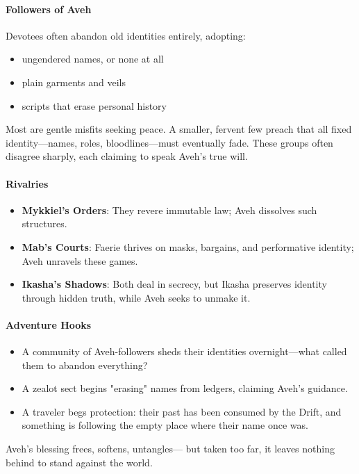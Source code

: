 \documentclass[11pt]{book}
\begin{document}
\paragraph{Followers of Aveh}
Devotees often abandon old identities entirely, adopting:
\begin{itemize}
    \item ungendered names, or none at all  
    \item plain garments and veils  
    \item scripts that erase personal history  
\end{itemize}

Most are gentle misfits seeking peace.  
A smaller, fervent few preach that all fixed identity---names, roles, bloodlines---must eventually fade.  
These groups often disagree sharply, each claiming to speak Aveh's true will.

\paragraph{Rivalries}
\begin{itemize}
    \item \textbf{Mykkiel's Orders}: They revere immutable law; Aveh dissolves such structures.
    \item \textbf{Mab's Courts}: Faerie thrives on masks, bargains, and performative identity; Aveh unravels these games.
    \item \textbf{Ikasha's Shadows}: Both deal in secrecy, but Ikasha preserves identity through hidden truth, while Aveh seeks to unmake it.
\end{itemize}

\paragraph{Adventure Hooks}
\begin{itemize}
    \item A community of Aveh-followers sheds their identities overnight---what called them to abandon everything?
    \item A zealot sect begins "erasing" names from ledgers, claiming Aveh's guidance.
    \item A traveler begs protection: their past has been consumed by the Drift, and something is following the empty place where their name once was.
\end{itemize}

\medskip

\noindent Aveh's blessing frees, softens, untangles---  
but taken too far, it leaves nothing behind to stand against the world.
\end{document}
